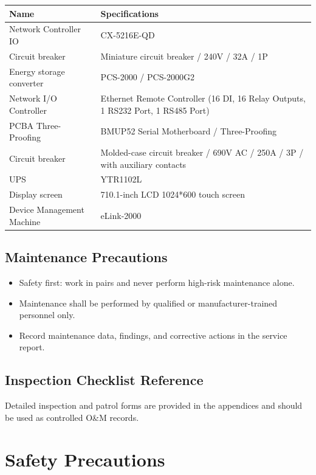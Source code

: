 \documentclass[11pt, a4paper]{article}
\newcommand{\sffont}{\sffamily\fontseries{b}\selectfont}
\begin{document}
\begin{tabularx}{\textwidth}{>{\sffont\raggedright\arraybackslash}p{5cm} X}
\toprule
\textbf{Name} & \textbf{Specifications} \\
\midrule
Network Controller IO & CX-5216E-QD \\
\addlinespace
Circuit breaker & Miniature circuit breaker / 240V / 32A / 1P \\
\addlinespace
Energy storage converter & PCS-2000 / PCS-2000G2 \\
\addlinespace
Network I/O Controller & Ethernet Remote Controller (16 DI, 16 Relay Outputs, 1 RS232 Port, 1 RS485 Port) \\
\addlinespace
PCBA Three-Proofing & BMUP52 Serial Motherboard / Three-Proofing \\
\addlinespace
Circuit breaker & Molded-case circuit breaker / 690V AC / 250A / 3P / with auxiliary contacts \\
\addlinespace
UPS & YTR1102L \\
\addlinespace
Display screen & 710.1-inch LCD 1024*600 touch screen \\
\addlinespace
Device Management Machine & eLink-2000 \\
\bottomrule
\end{tabularx}

\subsection{Maintenance Precautions}
\begin{itemize}[leftmargin=1.5em]
    \item Safety first: work in pairs and never perform high-risk maintenance alone.
    \item Maintenance shall be performed by qualified or manufacturer-trained personnel only.
    \item Record maintenance data, findings, and corrective actions in the service report.
\end{itemize}

\subsection{Inspection Checklist Reference}
Detailed inspection and patrol forms are provided in the appendices and should be used as controlled O\&M records.

\section{Safety Precautions}
\end{document}
